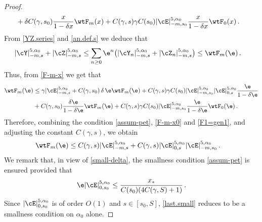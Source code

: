 \documentclass[a4paper,reqno,10pt]{article}
\begin{document}
\begin{proof}
\begin{align}
		 	&  +  \delta C(\gamma,s_0)\frac{x}{1-\delta x}\wtF_m(x) + C(\gamma,s) \gamma C(s_0)|\cE|_{-m,s_0}^{5,\alpha_{0}}\frac{x}{1-\delta x}\wtF_0(x)  \,.\label{F-m-x}
		 	\end{align}
            From \eqref{YZ.series} and \eqref{an.def.s} we deduce that
            \begin{align}
		|\cY|_{-m,s}^{5,\alpha_{0}} + |\cZ|_{-m,s}^{5,\alpha_{0}} &\leq \sum_{n\geq 0}  \e^n \big( |\cY_{n}|_{-m,s}^{5,\alpha_{0}} + |\cZ_{n}|_{-m,s}^{5,\alpha_{0}}  \big) \leq \wtF_m(\e) \,.
	\end{align}
    Thus, from \eqref{F-m-x} we get that
    \begin{align}\label{F-m-x0}
		 	\nonumber \wtF_m(\e) & \leq \gamma |\cE|_{-m,s}^{5,\alpha_{0}}+  C(\gamma, s_0)\,  \delta\,  \e \wtF_m(\e) + C(\gamma,s)  \gamma C(s_0) |\cE|_{-m,s_0}^{5,\alpha_{0}} |\cE|_{0,s}^{5,\alpha_{0}}  \frac{\e}{1-\delta \e} \\
		 	 	&  +   C(\gamma,s_0)\frac{\delta\e}{1-\delta \e}\wtF_m(\e) + C(\gamma,s) \gamma C(s_0) |\cE|_{-m,s_0}^{5,\alpha_{0}}\frac{\e}{1-\delta \e}\wtF_0(\e)  \,.
		 	\end{align}
            Therefore, combining  the condition \eqref{assum-pet}, \eqref{F-m-x0} and \eqref{F1=gen1}, and  adjusting the constant $C(\gamma,s)$, we obtain
            \begin{align*}
		  \wtF_m(\e) & \leq C(\gamma,s) |\cE|_{-m,s}^{5,\alpha_{0}}+ C(\gamma,s)  |\cE|_{0,s}^{5,\alpha_{0}}  |\cE|_{-m,s_0}^{5,\alpha_{0}}    \,.
		 	\end{align*}
            We remark that, in view of \eqref{small-delta}, the smallness condition \eqref{assum-pet} is ensured provided that
            \begin{align} \label{last.small}
            { \e} |\cE|_{0,s_0}^{5,\alpha_{0}}\leq\frac{x_*}{C(s_0)(4C(\gamma,S)+1)} \,.
        \end{align}
\noindent Since $ |\cE|_{0,s_0}^{5,\alpha_{0}}$ is of order $O(1)$ and $ s \in [s_0,S]$, \eqref{last.small} reduces to be a smallness condition on $ \alpha_0$ alone.



\end{proof}
\end{document}
